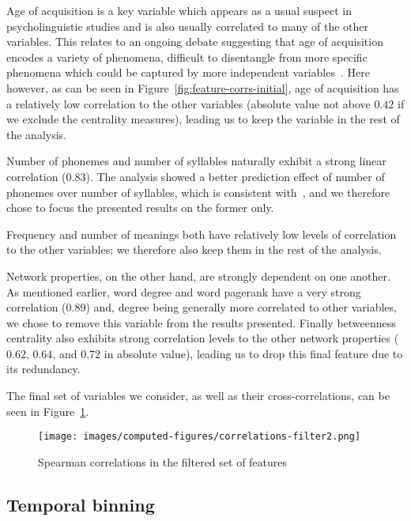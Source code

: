 
Age of acquisition is a key variable which appears as a usual suspect in psycholinguistic studies and is also usually correlated to many of the other variables.
This relates to an ongoing debate suggesting that age of acquisition encodes a variety of phenomena, difficult to disentangle from more specific phenomena which could be captured by more independent variables~\CN{}.
Here however, as can be seen in Figure~\ref{fig:feature-corrs-initial}, age of acquisition has a relatively low correlation to the other variables (absolute value not above $0.42$ if we exclude the centrality measures), leading us to keep the variable in the rest of the analysis.

Number of phonemes and number of syllables naturally exhibit a strong linear correlation ($0.83$).
The analysis showed a better prediction effect of number of phonemes over number of syllables, which is consistent with~\citet{nick-diss}, and we therefore chose to focus the presented results on the former only.

Frequency and number of meanings both have relatively low levels of correlation to the other variables; we therefore also keep them in the rest of the analysis.

\bigskip
Network properties, on the other hand, are strongly dependent on one another.
As mentioned earlier, word degree and word pagerank have a very strong correlation ($0.89$) and, degree being generally more correlated to other variables, we chose to remove this variable from the results presented.
Finally betweenness centrality also exhibits strong correlation levels to the other network properties ($0.62$, $0.64$, and $0.72$ in absolute value), leading us to drop this final feature due to its redundancy.

The final set of variables we consider, as well as their cross-correlations, can be seen in Figure~\ref{fig:feature-corrs-filtered}.

\begin{figure}[!th]
    \centering
    \texttt{[image: images/computed-figures/correlations-filter2.png]}
    \caption{Spearman correlations in the filtered set of features}
    \label{fig:feature-corrs-filtered}
\end{figure}


\subsection{Temporal binning}
\label{sec:temporal-binning}

